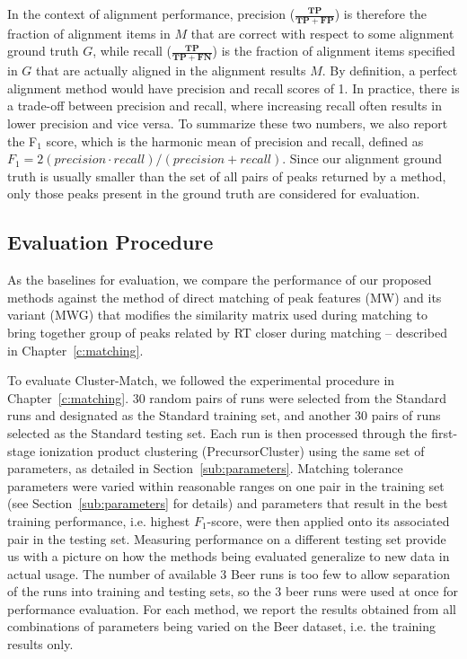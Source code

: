 In the context of alignment performance, precision ($\frac{\boldsymbol{TP}}{\boldsymbol{TP}+\boldsymbol{FP}}$) is therefore the fraction of alignment items in $M$ that are correct with respect to some alignment ground truth $G$, while recall ($\frac{\boldsymbol{TP}}{\boldsymbol{TP}+\boldsymbol{FN}}$) is the fraction of alignment items specified in $G$ that are actually aligned in the alignment results $M$. By definition, a perfect alignment method would have precision and recall scores of 1. In practice, there is a trade-off between precision and recall, where increasing recall often results in lower precision and vice versa. To summarize these two numbers, we also report the F$_1$ score, which is the harmonic mean of precision and recall, defined as $F_1 = 2(precision\cdot recall)/(precision + recall)$. Since our alignment ground truth is usually smaller than the set of all pairs of peaks returned by a method, only those peaks present in the ground truth are considered for evaluation. 

\subsection{Evaluation Procedure\label{sub:evaluation_procedure}}

As the baselines for evaluation, we compare the performance of our proposed methods against the method of direct matching of peak features (MW) and its variant (MWG) that modifies the similarity matrix used during matching to bring together group of peaks related by RT closer during matching -- described in Chapter~\ref{c:matching}. 

To evaluate Cluster-Match, we followed the experimental procedure in Chapter~\ref{c:matching}. 30 random pairs of runs were selected from the Standard runs and designated as the Standard training set, and another 30 pairs of runs selected as the Standard testing set. Each run is then processed through the first-stage ionization product clustering (PrecursorCluster) using the same set of parameters, as detailed in Section~\ref{sub:parameters}. Matching tolerance parameters were varied within reasonable ranges on one pair in the training set (see Section~\ref{sub:parameters} for details) and parameters that result in the best training performance, i.e. highest $F_1$-score, were then applied onto its associated pair in the testing set. Measuring performance on a different testing set provide us with a picture on how the methods being evaluated generalize to new data in actual usage. The number of available 3 Beer runs is too few to allow separation of the runs into training and testing sets, so the 3 beer runs were used at once for performance evaluation. For each method, we report the results obtained from all combinations of parameters being varied on the Beer dataset, i.e. the training results only.


